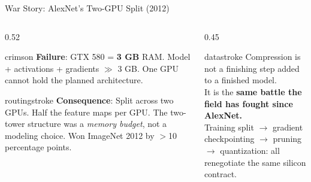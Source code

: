 \documentclass[aspectratio=169, 12pt]{beamer}
\begin{document}
\begin{frame}{War Story: AlexNet's Two-GPU Split (2012)}
\begin{columns}[T]
\begin{column}{0.52\textwidth}
    \vspace{0.1cm}
    \begin{mlsyscard}{crimson}
    {\scriptsize \textbf{Failure}: GTX 580 = \textbf{3 GB} RAM. Model + activations + gradients
    $\gg$ 3 GB. One GPU cannot hold the planned architecture.}
    \end{mlsyscard}

    \vspace{0.1cm}
    \begin{mlsyscard}{routingstroke}
    {\scriptsize \textbf{Consequence}: Split across two GPUs. Half the feature maps per GPU.
    The two-tower structure was a \emph{memory budget}, not a modeling choice.
    Won ImageNet 2012 by $>$10 percentage points.}
    \end{mlsyscard}
  \end{column}
  \begin{column}{0.45\textwidth}
    \vspace{0.5cm}

    \vspace{0.2cm}
    \begin{mlsyscard}{datastroke}
    {\scriptsize Compression is not a finishing step added to a finished model.\\[0.1cm]
    It is the \textbf{same battle the field has fought since AlexNet.}\\[0.1cm]
    Training split $\to$ gradient checkpointing $\to$ pruning $\to$ quantization: all renegotiate the same silicon contract.}
    \end{mlsyscard}
  \end{column}
\end{columns}

\end{frame}
\end{document}
